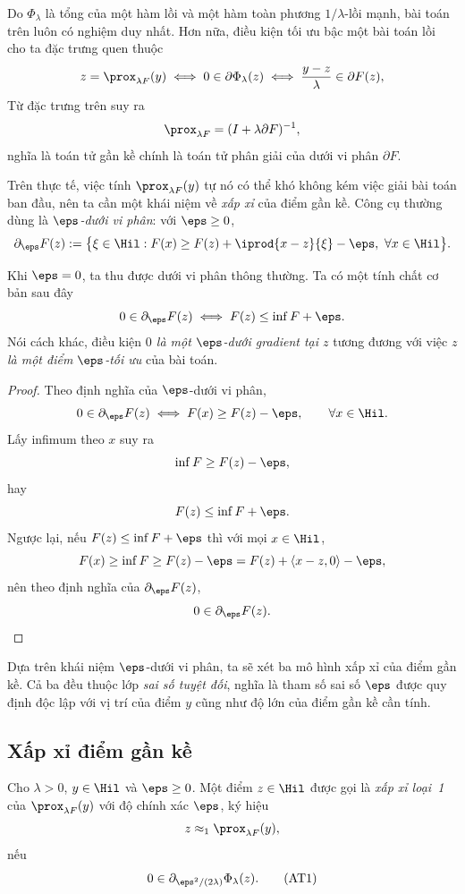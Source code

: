 Do $\Phi_\lambda$ là tổng của một hàm lồi và một hàm toàn phương
$1/\lambda$-lồi mạnh, bài toán trên luôn có nghiệm duy nhất. Hơn nữa,
điều kiện tối ưu bậc một bài toán lồi cho ta đặc trưng quen thuộc
\begin{equation}
  z = \prox_{\lambda F}(y)
  \iff 0 \in \partial \Phi_\lambda(z)
  \iff \frac{y-z}{\lambda} \in \partial F(z),
  \label{eq:opt-cond}
\end{equation}
Từ đặc trưng trên suy ra $$\prox_{\lambda F}=(I+\lambda\partial F)^{-1},$$ nghĩa là toán tử gần kề chính là toán tử phân giải của dưới vi phân $\partial F$.

Trên thực tế, việc tính $\prox_{\lambda F}(y)$ tự nó có thể khó không kém việc giải bài toán ban đầu, nên ta cần một khái niệm về \emph{xấp xỉ} của điểm gần kề. Công cụ thường dùng là \emph{$\eps$-dưới vi phân}: với $\eps\ge 0$,
\begin{equation}
  \partial_\eps F(z) := \big\{ \xi\in\Hil :
     F(x) \ge F(z) + \iprod{x-z}{\xi} - \eps,\ \forall x\in\Hil \big\}.
  \label{eq:eps-subdiff}
\end{equation}

Khi $\eps=0$, ta thu được dưới vi phân thông thường. Ta có một tính chất cơ bản sau đây
\begin{equation}
  0\in\partial_\eps F(z)
  \iff
  F(z)\le\inf F+\eps.
  \label{eq:eps-subopt}
\end{equation}
Nói cách khác, điều kiện \textit{$0$ là một $\eps$-dưới gradient tại $z$} tương đương với việc \textit{$z$ là một điểm $\eps$-tối ưu} của bài toán. 
\begin{proof}
Theo định nghĩa của $\eps$-dưới vi phân,
\[
0\in\partial_\eps F(z)
\iff
F(x)\ge F(z)-\eps,\qquad\forall x\in\Hil.
\]
Lấy infimum theo $x$ suy ra
\[
\inf F\ge F(z)-\eps,
\]
hay 
\[
F(z)\le\inf F+\eps.
\]
Ngược lại, nếu $F(z)\le\inf F+\eps$ thì với mọi $x\in\Hil$,
\[
F(x)\ge\inf F\ge F(z)-\eps
=
F(z)+\langle x-z,0\rangle-\eps,
\]
nên theo định nghĩa của $\partial_\eps F(z)$,
\[
0\in\partial_\eps F(z).
\]
\end{proof}

Dựa trên khái niệm $\eps$-dưới vi phân, ta sẽ xét ba mô hình xấp xỉ của điểm gần kề. Cả ba đều thuộc lớp \emph{sai số tuyệt đối}, nghĩa là tham số sai số $\eps$ được quy định độc lập với vị trí của điểm $y$ cũng như độ lớn của điểm gần kề cần tính.

\subsection{Xấp xỉ điểm gần kề}
\begin{definition}
Cho $\lambda>0$, $y\in\Hil$ và $\eps\ge0$. Một điểm
$z\in\Hil$ được gọi là \emph{xấp xỉ loại~1} của
$\prox_{\lambda F}(y)$ với độ chính xác $\eps$, ký hiệu
\[
z\approx_1\prox_{\lambda F}(y),
\]
nếu
\begin{equation}
0\in\partial_{\eps^2/(2\lambda)}\Phi_\lambda(z).
\tag{AT1}
\label{eq:AT1}
\end{equation}
\end{definition}


